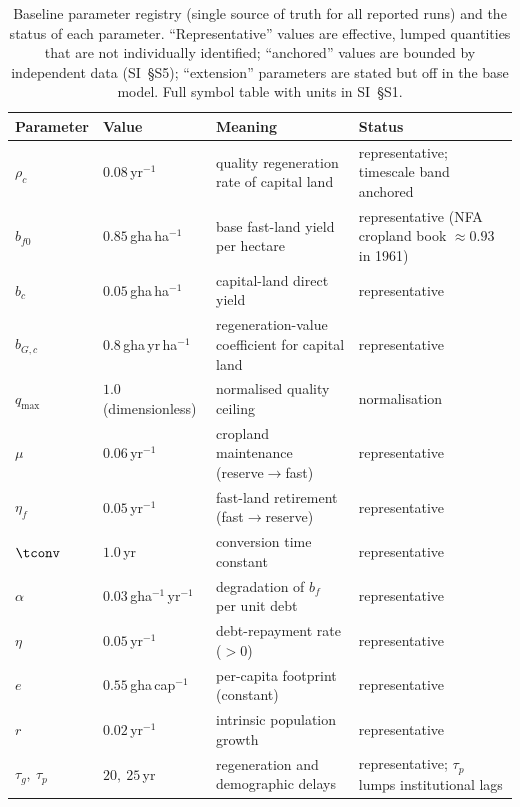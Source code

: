 \begin{table}[!htbp]
\centering\footnotesize
\caption{Baseline parameter registry (single source of truth for all reported runs) and the status of each parameter. ``Representative'' values are effective, lumped quantities that are not individually identified; ``anchored'' values are bounded by independent data (SI~\S S5); ``extension'' parameters are stated but off in the base model. Full symbol table with units in SI~\S S1.}
\label{tab:params}
\setlength{\tabcolsep}{4pt}
\begin{tabularx}{\textwidth}{@{}>{\raggedright\arraybackslash}p{} >{\raggedright\arraybackslash}p{} >{\raggedright\arraybackslash}X >{\raggedright\arraybackslash}p{}@{}}
\toprule
Parameter & Value & Meaning & Status \\
\midrule
$\rho_c$ & $0.08$\,yr$^{-1}$ & quality regeneration rate of capital land & representative; timescale band anchored \\
$b_{f0}$ & $0.85$\,gha\,ha$^{-1}$ & base fast-land yield per hectare & representative (NFA cropland book $\approx0.93$ in 1961) \\
$b_c$ & $0.05$\,gha\,ha$^{-1}$ & capital-land direct yield & representative \\
$b_{G,c}$ & $0.8$\,gha\,yr\,ha$^{-1}$ & regeneration-value coefficient for capital land & representative \\
$q_{\max}$ & $1.0$ (dimensionless) & normalised quality ceiling & normalisation \\
$\mu$ & $0.06$\,yr$^{-1}$ & cropland maintenance (reserve$\to$fast) & representative \\
$\eta_f$ & $0.05$\,yr$^{-1}$ & fast-land retirement (fast$\to$reserve) & representative \\
$\tconv$ & $1.0$\,yr & conversion time constant & representative \\
$\alpha$ & $0.03$\,gha$^{-1}$\,yr$^{-1}$ & degradation of $b_f$ per unit debt & representative \\
$\eta$ & $0.05$\,yr$^{-1}$ & debt-repayment rate ($>0$) & representative \\
$e$ & $0.55$\,gha\,cap$^{-1}$ & per-capita footprint (constant) & representative \\
$r$ & $0.02$\,yr$^{-1}$ & intrinsic population growth & representative \\
$\tau_g,\ \tau_p$ & $20,\ 25$\,yr & regeneration and demographic delays & representative; $\tau_p$ lumps institutional lags \\

\end{tabularx}
\end{table}
